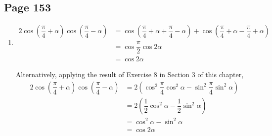 \documentclass{article}
\newenvironment{solutions}[1]
{\subsection*{#1}
 \begin{enumerate}[leftmargin=1.5em]}
{\end{enumerate}}
\newcommand{\solution}{\item}
\newenvironment{subsolutions}
{\begin{enumerate}}
{\end{enumerate}}
\newcommand{\subsolution}{\item}
\begin{document}
\begin{solutions}{Page 153}
\begin{subsolutions}
Alternatively, by the cosine subtraction formula, $\cos{60\degree} = \cos{75\degree}\cos{15\degree} + \sin{75\degree}\sin{15\degree}$ so
\[
\cos{75\degree}\cos{15\degree} = \cos{60\degree} - \sin{75\degree}\sin{15\degree} = \dfrac{1}{2} - \dfrac{1}{4} = \dfrac{1}{4}
\]

Alternatively, using the idea of sine and cosine being cofunctions,
\[
\cos{75\degree}\cos{15\degree} = \sin\left(90\degree-75\degree\right)\sin\left(90\degree-15\degree\right) = \sin{15\degree}\sin{75\degree} = \dfrac{1}{4}
\]
For the above two alternative solutions, we apply the result from Exercise 2 above that $\sin{75\degree}\sin{15\degree} = 1/4$.

\subsolution %
\begin{align*}
\cos{75\degree}\sin{15\degree} &= \dfrac{1}{2}\sin\left(15\degree+75\degree\right) + \dfrac{1}{2}\sin\left(15\degree-75\degree\right) \\
&= \dfrac{1}{2}\sin{90\degree} - \dfrac{1}{2}\sin{60\degree} \\
&= \dfrac{1}{2} \cdot 1 - \dfrac{1}{2} \cdot \dfrac{\sqrt{3}}{2} \\
&= \dfrac{2-\sqrt{3}}{4}
\end{align*}

Alternatively, by the sine addition formula, $\sin{90\degree} = \sin{75\degree}\cos{15\degree} + \cos{75\degree}\sin{15\degree}$ so
\[
\cos{75\degree}\sin{15\degree} = \sin{90\degree} - \sin{75\degree}\cos{15\degree} = 1 - \dfrac{2+\sqrt{3}}{4} = \dfrac{2-\sqrt{3}}{4}
\]
For the above alternative solution, we apply the result from Exercise 3 above that $\sin{75\degree}\cos{15\degree} = \left(2+\sqrt{3}\right)/4$.
\end{subsolutions}

\solution %
\begin{align*}
2\cos\left(\dfrac{\pi}{4}+\alpha\right)\cos\left(\dfrac{\pi}{4}-\alpha\right) &= \cos\left(\dfrac{\pi}{4} + \alpha + \dfrac{\pi}{4} - \alpha\right) + \cos\left(\dfrac{\pi}{4} + \alpha - \dfrac{\pi}{4} + \alpha\right) \\
&= \cos{\dfrac{\pi}{2}} \cos{2\alpha} \\
&= \cos{2\alpha}
\end{align*}

Alternatively, applying the result of Exercise 8 in Section 3 of this chapter,
\begin{align*}
2\cos\left(\dfrac{\pi}{4}+\alpha\right)\cos\left(\dfrac{\pi}{4}-\alpha\right) &= 2\left(\cos^{2}{\dfrac{\pi}{4}}\cos^{2}{\alpha} - \sin^{2}{\dfrac{\pi}{4}}\sin^{2}{\alpha}\right) \\
&= 2\left(\dfrac{1}{2}\cos^{2}{\alpha} - \dfrac{1}{2}\sin^{2}{\alpha}\right) \\
&= \cos^{2}{\alpha} - \sin^{2}{\alpha} \\
&= \cos{2\alpha}
\end{align*}


\end{solutions}
\end{document}
